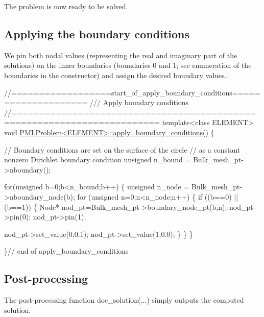 The problem is now ready to be solved.\hypertarget{index_apply_bc}{}\subsection{Applying the boundary conditions}\label{index_apply_bc}
We pin both nodal values (representing the real and imaginary part of the solutions) on the inner boundaries (boundaries 0 and 1; see enumeration of the boundaries in the constructor) and assign the desired boundary values.

 
\begin{DoxyCodeInclude}
\textcolor{comment}{//==================start\_of\_apply\_boundary\_conditions====================}
\textcolor{comment}{/// Apply boundary conditions}
\textcolor{comment}{}\textcolor{comment}{//========================================================================}
\textcolor{keyword}{template}<\textcolor{keyword}{class} ELEMENT>
\textcolor{keywordtype}{void} \hyperlink{classPMLProblem_a2d2cdf5c1e99a7600d91353fd0584d5c}{PMLProblem<ELEMENT>::apply\_boundary\_conditions}()
\{

 \textcolor{comment}{// Boundary conditions are set on the surface of the circle}
 \textcolor{comment}{// as a constant nonzero Dirichlet boundary condition}
 \textcolor{keywordtype}{unsigned} n\_bound = Bulk\_mesh\_pt->nboundary();

 \textcolor{keywordflow}{for}(\textcolor{keywordtype}{unsigned} b=0;b<n\_bound;b++)
  \{
   \textcolor{keywordtype}{unsigned} n\_node = Bulk\_mesh\_pt->nboundary\_node(b);
   \textcolor{keywordflow}{for} (\textcolor{keywordtype}{unsigned} n=0;n<n\_node;n++)
    \{
     \textcolor{keywordflow}{if} ((b==0) || (b==1))
      \{
       Node* nod\_pt=Bulk\_mesh\_pt->boundary\_node\_pt(b,n);
       nod\_pt->pin(0);
       nod\_pt->pin(1);

       nod\_pt->set\_value(0,0.1);
       nod\_pt->set\_value(1,0.0);
      \}
    \}
  \}

\}\textcolor{comment}{// end of apply\_boundary\_conditions}

\end{DoxyCodeInclude}
\hypertarget{index_doc}{}\subsection{Post-\/processing}\label{index_doc}
The post-\/processing function {\ttfamily doc\+\_\+solution}(...) simply outputs the computed solution.

